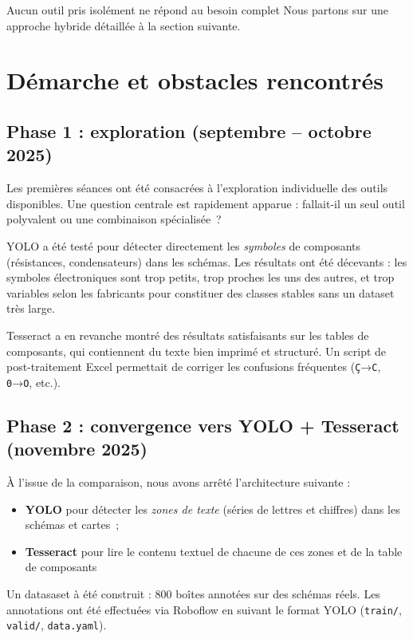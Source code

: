 \documentclass[a4paper,11pt]{article} %
\begin{document}
Aucun outil pris isolément ne répond au besoin complet
Nous partons sur une approche hybride détaillée à la section suivante.

\section{Démarche et obstacles rencontrés}

\subsection{Phase 1 : exploration (septembre -- octobre 2025)}

Les premières séances ont été consacrées à l'exploration individuelle des outils disponibles.
Une question centrale est rapidement apparue : fallait-il un seul outil polyvalent ou
une combinaison spécialisée~?

YOLO a été testé pour détecter directement les \textit{symboles} de composants
(résistances, condensateurs) dans les schémas.
Les résultats ont été décevants : les symboles électroniques sont trop petits, trop proches
les uns des autres, et trop variables selon les fabricants pour constituer des classes
stables sans un dataset très large.

Tesseract a en revanche montré des résultats satisfaisants sur les tables de composants, qui contiennent du texte bien imprimé et structuré.
Un script de post-traitement Excel permettait de corriger les confusions fréquentes
(\texttt{Ç}→\texttt{C}, \texttt{0}→\texttt{O}, etc.).

\subsection{Phase 2 : convergence vers YOLO + Tesseract (novembre 2025)}

À l'issue de la comparaison, nous avons arrêté l'architecture suivante :
\begin{itemize}
  \item \textbf{YOLO} pour détecter les \textit{zones de texte} (séries de lettres et chiffres)
        dans les schémas et cartes~;
  \item \textbf{Tesseract} pour lire le contenu textuel de chacune de ces zones
        et de la table de composants
\end{itemize}

Un datasaset à été construit : 800 boîtes annotées sur des schémas réels. Les annotations ont été effectuées via Roboflow en suivant le format YOLO
(\texttt{train/}, \texttt{valid/}, \texttt{data.yaml}).
\end{document}
